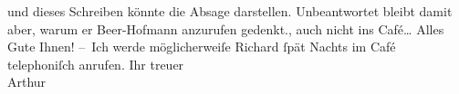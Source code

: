 \begin{ledgroupsized}[t]{13cm}
{{{                  und dieses Schreiben könnte die Absage darstellen. Unbeantwortet bleibt damit
                  aber, warum er Beer-Hofmann anzurufen
                  gedenkt.}}}\label{K_L00997-1h}, auch nicht ins Café{\dots}\pend
           \pstart
           Alles Gute Ihnen!\pend
           \pstart
           – Ich werde möglicherweiſe Richard ſpät Nachts
               im Café te{\pb}lephoniſch anrufen.\pend
           \pstart
           Ihr treuer{\\}\spacefill\mbox{Arthur}\pend
           
         
         \endnumbering{}\end{ledgroupsized}  \newcommand{\dateiname}{L00997}\newcommand{\titel}{Arthur Schnitzler an Hugo von Hofmannsthal, [18. 11. 1899?]}\newcommand{\editorInnen}{Martin Anton Müller und Gerd-Hermann Susen}
      